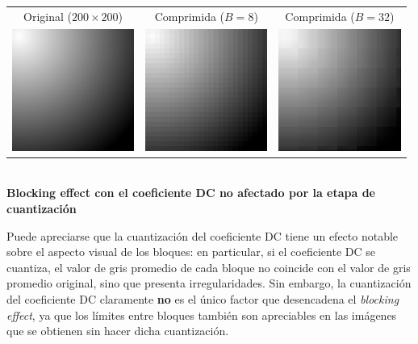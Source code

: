 \documentclass{article}
\begin{document}
\begin{center}
\begin{tabular}{|c|c|c|}
\hline
Original ($200 \times 200$)
&
Comprimida ($B = 8$)
&
Comprimida ($B = 32$)
\\
\includegraphics[width=4cm]{../imgs/output/blocking_effect/blocking.png}
&
\includegraphics[width=4cm]{../imgs/output/blocking_effect/blocking_notrunc_b8.png}
&
\includegraphics[width=4cm]{../imgs/output/blocking_effect/blocking_notrunc_b32.png} \\
\hline
\end{tabular}\\
{\bf Blocking effect con el coeficiente DC no afectado por la etapa de cuantización}
\end{center}

Puede apreciarse que la cuantización del coeficiente DC tiene un efecto
notable sobre el aspecto visual de los bloques: en particular, si el
coeficiente DC se cuantiza, el valor de gris promedio de cada bloque
no coincide con el valor de gris promedio original, sino que presenta
irregularidades.
Sin embargo, la cuantización del coeficiente DC claramente {\bf no} es el
único factor que desencadena el {\em blocking effect}, ya que los
límites entre bloques también son apreciables en las imágenes que
se obtienen sin hacer dicha cuantización.
\end{document}
